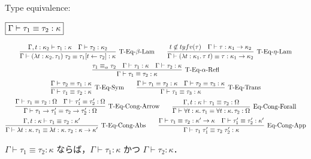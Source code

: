 Type equivalence:

$\fbox{$\Gamma \vdash \tau_1 \equiv \tau_2: \kappa$}$

\begin{gather*}
  \infer[\text{T-Eq-$\beta$-Lam}]{\Gamma \vdash (\lambda t: \kappa_2\ldotp \tau_1)\; \tau_2 \equiv \tau_1[t \assign \tau_2]: \kappa}{
    \Gamma, t: \kappa_2 \vdash \tau_1: \kappa
    &
    \Gamma \vdash \tau_2: \kappa_2
  }
  \hspace{2em}
  \infer[\text{T-Eq-$\eta$-Lam}]{\Gamma \vdash (\lambda t: \kappa_1\ldotp \tau\; t) \equiv \tau: \kappa_1 \to \kappa_2}{
    t \not\in \typefreevar(\tau)
    &
    \Gamma \vdash \tau: \kappa_1 \to \kappa_2
  }
  \\
  \infer[\text{T-Eq-$\alpha$-Refl}]{\Gamma \vdash \tau_1 \equiv \tau_2: \kappa}{
    \tau_1 \equiv_\alpha \tau_2
    &
    \Gamma \vdash \tau_1: \kappa
    &
    \Gamma \vdash \tau_2: \kappa
  }
  \\
  \infer[\text{T-Eq-Sym}]{\Gamma \vdash \tau_1 \equiv \tau_2: \kappa}{
    \Gamma \vdash \tau_2 \equiv \tau_1: \kappa
  }
  \hspace{2em}
  \infer[\text{T-Eq-Trans}]{\Gamma \vdash \tau_1 \equiv \tau_3: \kappa}{
    \Gamma \vdash \tau_1 \equiv \tau_2: \kappa
    &
    \Gamma \vdash \tau_2 \equiv \tau_3: \kappa
  }
  \\
  \infer[\text{T-Eq-Cong-Arrow}]{\Gamma \vdash \tau_1 \to \tau'_1 \equiv \tau_2 \to \tau'_2: \Omega}{
    \Gamma \vdash \tau_1 \equiv \tau_2: \Omega
    &
    \Gamma \vdash \tau'_1 \equiv \tau'_2: \Omega
  }
  \hspace{2em}
  \infer[\text{Eq-Cong-Forall}]{\Gamma \vdash \forall t: \kappa\ldotp \tau_1 \equiv \forall t: \kappa\ldotp \tau_2: \Omega}{
    \Gamma, t: \kappa \vdash \tau_1 \equiv \tau_2: \Omega
  }
  \\
  \infer[\text{T-Eq-Cong-Abs}]{\Gamma \vdash \lambda t: \kappa\ldotp \tau_1 \equiv \lambda t: \kappa\ldotp \tau_2: \kappa \to \kappa'}{
    \Gamma, t: \kappa \vdash \tau_1 \equiv \tau_2: \kappa'
  }
  \hspace{2em}
  \infer[\text{Eq-Cong-App}]{\Gamma \vdash \tau_1\; \tau'_1 \equiv \tau_2\; \tau'_2: \kappa}{
    \Gamma \vdash \tau_1 \equiv \tau_2: \kappa' \to \kappa
    &
    \Gamma \vdash \tau'_1 \equiv \tau'_2: \kappa'
  }
\end{gather*}

\begin{theorem}
  $\Gamma \vdash \tau_1 \equiv \tau_2: \kappa$ ならば，$\Gamma \vdash \tau_1: \kappa$ かつ $\Gamma \vdash \tau_2: \kappa$．
\end{theorem}

